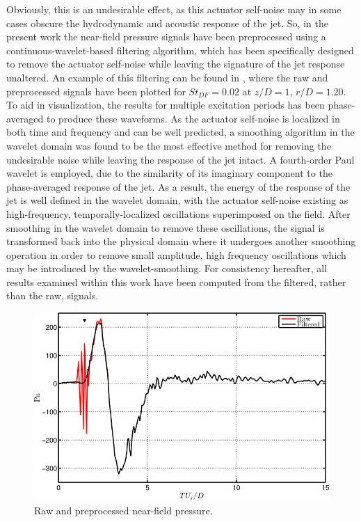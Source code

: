 Obviously, this is an undesirable effect, as this actuator self-noise may in some cases obscure the hydrodynamic and acoustic response of the jet.
So, in the present work the near-field pressure signals have been preprocessed using a continuous-wavelet-based filtering algorithm, which has been specifically designed to remove the actuator self-noise while leaving the signature of the jet response unaltered. 
An example of this filtering can be found in , where the raw and preprocessed signals have been plotted for $St_{DF} = 0.02$ at $z/D = 1$, $r/D = 1.20$. 
To aid in visualization, the results for multiple excitation periods has been phase-averaged to produce these waveforms. 
As the actuator self-noise is localized in both time and frequency and can be well predicted, a smoothing algorithm in the wavelet domain was found to be the most effective method for removing the undesirable noise while leaving the response of the jet intact. 
A fourth-order Paul wavelet is employed, due to the similarity of its imaginary component to the phase-averaged response of the jet. 
As a result, the energy of the response of the jet is well defined in the wavelet domain, with the actuator self-noise existing as high-frequency, temporally-localized oscillations superimposed on the field. 
After smoothing in the wavelet domain to remove these oscillations, the signal is transformed back into the physical domain where it undergoes another smoothing operation in order to remove small amplitude, high frequency oscillations which may be introduced by the wavelet-smoothing. 
For consistency hereafter, all results examined within this work have been computed from the filtered, rather than the raw, signals.
\begin{figure}
	\centering
	\includegraphics{Figures/NearField_Preprocessing_Filtering.png}
	\caption{Raw and preprocessed near-field pressure.}
	\label{fig:preprocessing:wavelet_filter}
\end{figure} 

